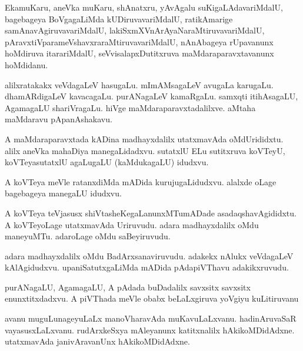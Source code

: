 \documentclass{article}
\begin{document}
\begin{mn}
EkamuKaru,  aneVka  muKaru,  shAnatxru,  yAvAgalu  suKigaLAdavariMdalU,  bagebageya  BoVgagaLiMda  
kUDiruvavariMdalU,  ratikAmarige  samAnavAgiruvavariMdalU,  lakiSxmXVnArAyaNaraMtiruvavariMdalU,  
pAravxtiVparameVshavxraraMtiruvavariMdalU,  nAnAbageya  rUpavanunx  hoMdiruva  itarariMdalU,  
seVvisalapxDutitxruva  maMdaraparavxtavanunx  hoMdidanu.
\end{mn}

\begin{mn}
alilxratakakx  veVdagaLeV  hasugaLu.  mImAMsagaLeV  avugaLa  karugaLu.  dhamARdigaLeV  kavacagaLu.  
purANagaLeV  kamaRgaLu.  samxqti  itihAsagaLU,  AgamagaLU  shariVragaLu.  hiVge  maMdaraparavxtadalilxve.  
aMtaha  maMdaravu  pApanAshakavu.
\end{mn}

\begin{mn}
A  maMdaraparavxtada  kADina  madhayxdalilx  utatxmavAda  oMdUrididxtu.  alilx  aneVka  mahaDiya 
 manegaLidadxvu.  sutatxlU  ELu  sutitxruva  koVTeyU,  koVTeyasutatxlU  agaLugaLU (kaMdukagaLU) idudxvu.
\end{mn}

\begin{mn}
A  koVTeya  meVle  ratanxdiMda  mADida  kurujugaLidudxvu.  alalxde  oLage  bagebageya  manegaLU  idudxvu.
\end{mn}

\begin{mn}
A  koVTeya  teVjasusx  shiVtasheKegaLanunxMTumADade  asadaqshavAgididxtu.  A  koVTeyoLage  utatxmavAda  
Uriruvudu.  adara  madhayxdalilx  oMdu  maneyuMTu.  adaroLage  oMdu  saBeyiruvudu.
\end{mn}

\begin{mn}
adara  madhayxdalilx  oMdu  BadArxsanaviruvudu.  adakekx  nAlukx  veVdagaLeV  kAlAgidudxvu.  
upaniSatutxgaLiMda  mADida  pAdapiVThavu  adakikxruvudu.
\end{mn}

\begin{mn}
purANagaLU,  AgamagaLU,  A  pAdada  buDadalilx  savxsitx savxsitx enunxtitxdadxvu.  A  piVThada  
meVle  obabx  beLaLxgiruva  yoVgiyu  kuLitiruvanu
\end{mn}

\begin{mn}
avanu  muguLunageyuLaLx  manoVharavAda  muKavuLaLxvanu.  hadinAruvaSaR  vayasusxLaLxvanu.  rudArxkeSxya  
mAleyanunx  katitxnalilx  hAkikoMDidAdxne.  utatxmavAda  janivAravanUnx  hAkikoMDidAdxne.
\end{mn}
\end{document}
